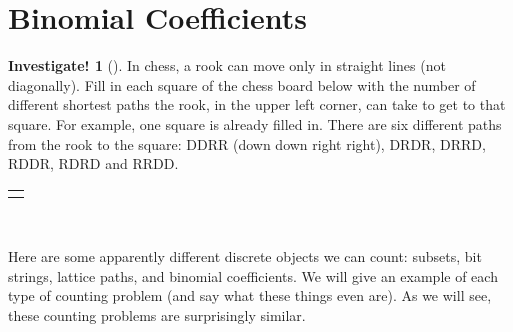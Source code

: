 \documentclass[12pt,]{book}
\theoremstyle{plain}
\theoremstyle{definition}
\theoremstyle{definition}
\theoremstyle{definition}
\newtheorem{investigation}[project]{Investigate!}
\numberwithin{equation}{chapter}
\newlength{\panelmax}
\begin{document}
\section[{Binomial Coefficients}]{Binomial Coefficients}\label{sec_counting-binom}
\begin{investigation}[]\label{investigation-12}
\hypertarget{p-816}{}%
In chess, a rook can move only in straight lines (not diagonally). Fill in each square of the chess board below with the number of different shortest paths the rook, in the upper left corner, can take to get to that square. For example, one square is already filled in. There are six different paths from the rook to the square: DDRR (down down right right), DRDR, DRRD, RDDR, RDRD and RRDD.%
{%
\setlength{\panelmax}{0pt}
\ifdefined\panelboxAimage\else\newsavebox{\panelboxAimage}\fi%
\begin{lrbox}{\panelboxAimage}
\end{lrbox}
\ifdefined\phAimage\else\newlength{\phAimage}\fi%
\setlength{\phAimage}{\ht\panelboxAimage+\dp\panelboxAimage}
\settototalheight{\phAimage}{\usebox{\panelboxAimage}}
\setlength{\panelmax}{\maxof{\panelmax}{\phAimage}}
\leavevmode%
\setlength{\tabcolsep}{0\linewidth}
\par\medskip\noindent
\hspace*{0.25\linewidth}%
\begin{tabular}{@{}*{1}{c}@{}}
\begin{minipage}[c][\panelmax][t]{0.5\linewidth}\usebox{\panelboxAimage}\end{minipage}\end{tabular}\\
}%
\end{investigation}
\hypertarget{p-817}{}%
Here are some apparently different discrete objects we can count: subsets, bit strings, lattice paths, and binomial coefficients. We will give an example of each type of counting problem (and say what these things even are). As we will see, these counting problems are surprisingly similar.%
\typeout{************************************************}
\typeout{************************************************}
\end{document}
